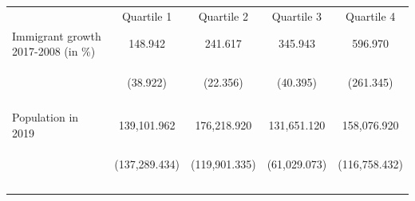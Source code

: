 \begin{center}
\begin{tabular}{lcccc}
\hline \noalign{\smallskip} & Quartile 1 & Quartile 2 & Quartile 3 & Quartile 4\\
\noalign{\smallskip}\hline \noalign{\smallskip}Immigrant growth 2017-2008 (in \%) & 148.942 & 241.617 & 345.943 & 596.970\\
 & \begin{footnotesize}(38.922)\end{footnotesize} & \begin{footnotesize}(22.356)\end{footnotesize} & \begin{footnotesize}(40.395)\end{footnotesize} & \begin{footnotesize}(261.345)\end{footnotesize}\\
 & \begin{footnotesize}\end{footnotesize} & \begin{footnotesize}\end{footnotesize} & \begin{footnotesize}\end{footnotesize} & \begin{footnotesize}\end{footnotesize}\\
\noalign{\smallskip}Population in 2019 & 139,101.962 & 176,218.920 & 131,651.120 & 158,076.920\\
 & \begin{footnotesize}(137,289.434)\end{footnotesize} & \begin{footnotesize}(119,901.335)\end{footnotesize} & \begin{footnotesize}(61,029.073)\end{footnotesize} & \begin{footnotesize}(116,758.432)\end{footnotesize}\\
 & \begin{footnotesize}\end{footnotesize} & \begin{footnotesize}\end{footnotesize} & \begin{footnotesize}\end{footnotesize} & \begin{footnotesize}\end{footnotesize}\\
\noalign{\smallskip}\hline\end{tabular}\\
\end{center}
